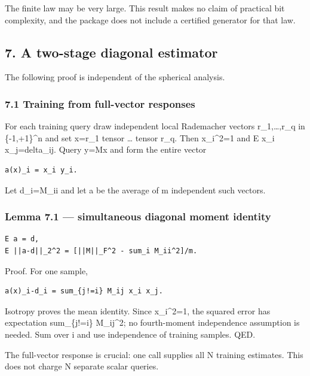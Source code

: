 \documentclass[
  10pt,
]{article}
\begin{document}
The finite law may be very large. This result makes no claim of
practical bit complexity, and the package does not include a certified
generator for that law.

\subsection{7. A two-stage diagonal
estimator}\label{a-two-stage-diagonal-estimator}

The following proof is independent of the spherical analysis.

\subsubsection{7.1 Training from full-vector
responses}\label{training-from-full-vector-responses}

For each training query draw independent local Rademacher vectors
r\_1,\ldots,r\_q in \{-1,+1\}\^{}n and set x=r\_1 tensor \ldots{} tensor
r\_q. Then x\_i\^{}2=1 and E x\_i x\_j=delta\_ij. Query y=Mx and form
the entire vector

\begin{verbatim}
a(x)_i = x_i y_i.
\end{verbatim}

Let d\_i=M\_ii and let a be the average of m independent such vectors.

\subsubsection{Lemma 7.1 --- simultaneous diagonal moment
identity}\label{lemma-7.1-simultaneous-diagonal-moment-identity}

\begin{verbatim}
E a = d,
E ||a-d||_2^2 = [||M||_F^2 - sum_i M_ii^2]/m.
\end{verbatim}

Proof. For one sample,

\begin{verbatim}
a(x)_i-d_i = sum_{j!=i} M_ij x_i x_j.
\end{verbatim}

Isotropy proves the mean identity. Since x\_i\^{}2=1, the squared error
has expectation sum\_\{j!=i\} M\_ij\^{}2; no fourth-moment independence
assumption is needed. Sum over i and use independence of training
samples. QED.

The full-vector response is crucial: one call supplies all N training
estimates. This does not charge N separate scalar queries.
\end{document}
